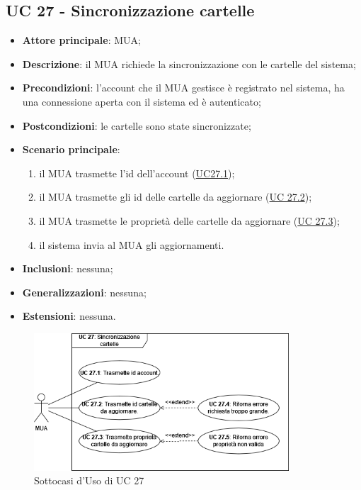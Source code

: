 
\subsection{UC 27 - Sincronizzazione cartelle} \label{sec:UC27}
    
    \begin{itemize}
        \item \textbf{Attore principale}: MUA;
        \item \textbf{Descrizione}: il MUA richiede la sincronizzazione con le cartelle del sistema;
        \item \textbf{Precondizioni}: l’account che il MUA gestisce è registrato nel sistema, ha una connessione aperta con il sistema ed è autenticato;
        \item \textbf{Postcondizioni}: le cartelle sono state sincronizzate;
        \item \textbf{Scenario principale}:
            \begin{enumerate}
                \item il MUA trasmette l'id dell'account (\hyperref[sec:UC27.1]{UC27.1});
                \item il MUA trasmette gli id delle cartelle da aggiornare (\hyperref[sec:UC27.2]{UC 27.2});
                \item il MUA trasmette le proprietà delle cartelle da aggiornare (\hyperref[sec:UC27.3]{UC 27.3});
                \item il sistema invia al MUA gli aggiornamenti.
            \end{enumerate}
        \item \textbf{Inclusioni}: nessuna;
        \item \textbf{Generalizzazioni}: nessuna;
        \item \textbf{Estensioni}: nessuna.
    \end{itemize}

    \begin{figure}[H]
        \includegraphics[width=0.85\textwidth]{sections/uc_imgs/UC27.png}
        \centering
        \caption{Sottocasi d'Uso di UC 27}
    \end{figure}

